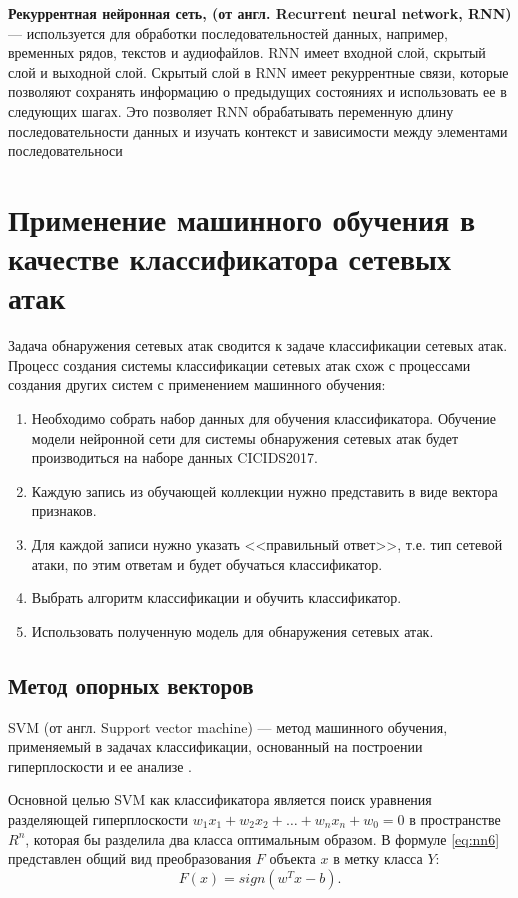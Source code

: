 \textbf{Рекуррентная нейронная сеть, (от англ. Recurrent neural network, RNN)} --- используется для обработки последовательностей данных, например, временных рядов, текстов и аудиофайлов. 
RNN имеет входной слой, скрытый слой и выходной слой. Скрытый слой в RNN имеет рекуррентные связи, которые позволяют сохранять информацию о предыдущих состояниях и использовать ее в следующих шагах.
Это позволяет RNN обрабатывать переменную длину последовательности данных и изучать контекст и зависимости между элементами последовательноси


\section{Применение машинного обучения в качестве классификатора сетевых атак}
Задача обнаружения сетевых атак сводится к задаче классификации сетевых атак. Процесс создания системы классификации сетевых атак схож с процессами создания других систем с применением машинного обучения:

\begin{enumerate}
    \item Необходимо собрать набор данных для обучения классификатора. Обучение модели нейронной сети для системы обнаружения сетевых атак будет производиться на наборе данных CICIDS2017.
    \item Каждую запись из обучающей коллекции нужно представить в виде вектора признаков.
    \item Для каждой записи нужно указать <<правильный ответ>>, т.е. тип сетевой атаки, по этим ответам и будет обучаться классификатор.
    \item Выбрать алгоритм классификации и обучить классификатор.
    \item Использовать полученную модель для обнаружения сетевых атак.
\end{enumerate}



\subsection{Метод опорных векторов}

SVM (от англ. Support vector machine) --- метод машинного обучения, применяемый в задачах классификации, основанный на построении гиперплоскости и ее анализе \cite{svm}.


Основной целью SVM как классификатора является поиск уравнения разделяющей гиперплоскости $w_1x_1+w_2x_2+…+w_nx_n+w_0=0$ в пространстве $R^n$, которая бы разделила два класса оптимальным образом. В формуле \ref{eq:nn6} представлен общий вид преобразования $F$ объекта $x$ в метку класса $Y$: 
\begin{equation}
	\label{eq:nn6}
	F(x) = sign(w^Tx-b).
\end{equation}

